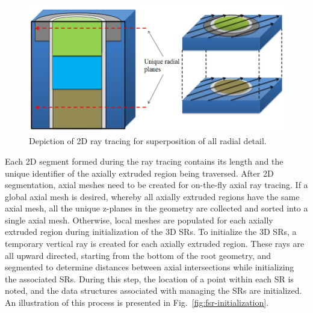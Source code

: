\begin{figure}[ht!]
	\centering
	\includegraphics[width=\linewidth]{figures/ph2016/new_unique_z_levels_v_extruded_rt2.png}
	\caption{Depiction of 2D ray tracing for superposition of all radial detail.}
	\label{fig:superposition}
\end{figure}

Each 2D segment formed during the ray tracing contains its length and the unique identifier of the axially extruded region being traversed. After 2D segmentation, axial meshes need to be created for on-the-fly axial ray tracing. If a global axial mesh is desired, whereby all axially extruded regions have the same axial mesh, all the unique z-planes in the geometry are collected and sorted into a single axial mesh. Otherwise, local meshes are populated for each axially extruded region during initialization of the 3D \ac{SR}s. To initialize the 3D \ac{SR}s, a temporary vertical ray is created for each axially extruded region. These rays are all upward directed, starting from the bottom of the root geometry, and segmented to determine distances between axial intersections while initializing the associated \ac{SR}s. During this step, the location of a point within each \ac{SR} is noted, and the data structures associated with managing the \ac{SR}s are initialized. An illustration of this process is presented in Fig.~\ref{fig:fsr-initialization}.

